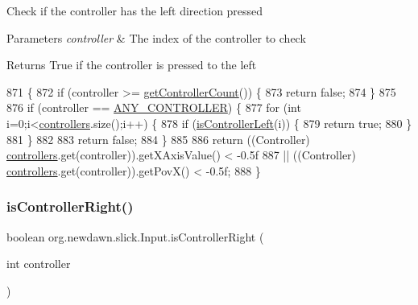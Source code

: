 Check if the controller has the left direction pressed


\begin{DoxyParams}{Parameters}
{\em controller} & The index of the controller to check \\
\hline
\end{DoxyParams}
\begin{DoxyReturn}{Returns}
True if the controller is pressed to the left 
\end{DoxyReturn}

\begin{DoxyCode}
871                                                     \{
872         \textcolor{keywordflow}{if} (controller >= \mbox{\hyperlink{classorg_1_1newdawn_1_1slick_1_1_input_a4a81c87f7d16d49471106d7fbaa0989d}{getControllerCount}}()) \{
873             \textcolor{keywordflow}{return} \textcolor{keyword}{false};
874         \}
875         
876         \textcolor{keywordflow}{if} (controller == \mbox{\hyperlink{classorg_1_1newdawn_1_1slick_1_1_input_a1f3df3cf41eaf8ae3bdf194d5cf96dd0}{ANY\_CONTROLLER}}) \{
877             \textcolor{keywordflow}{for} (\textcolor{keywordtype}{int} i=0;i<\mbox{\hyperlink{classorg_1_1newdawn_1_1slick_1_1_input_a1bcc91bf0db9efc578bd934a8ed9ce67}{controllers}}.size();i++) \{
878                 \textcolor{keywordflow}{if} (\mbox{\hyperlink{classorg_1_1newdawn_1_1slick_1_1_input_a872615473ab4b93e0baceccb68d62787}{isControllerLeft}}(i)) \{
879                     \textcolor{keywordflow}{return} \textcolor{keyword}{true};
880                 \}
881             \}
882             
883             \textcolor{keywordflow}{return} \textcolor{keyword}{false};
884         \}
885         
886         \textcolor{keywordflow}{return} ((Controller) \mbox{\hyperlink{classorg_1_1newdawn_1_1slick_1_1_input_a1bcc91bf0db9efc578bd934a8ed9ce67}{controllers}}.get(controller)).getXAxisValue() < -0.5f
887                 || ((Controller) \mbox{\hyperlink{classorg_1_1newdawn_1_1slick_1_1_input_a1bcc91bf0db9efc578bd934a8ed9ce67}{controllers}}.get(controller)).getPovX() < -0.5f;
888     \}
\end{DoxyCode}
\mbox{\label{classorg_1_1newdawn_1_1slick_1_1_input_a216e74d174302d5f2656027f0983d53a}} 
\subsubsection{\texorpdfstring{is\+Controller\+Right()}{isControllerRight()}}
{\footnotesize\ttfamily boolean org.\+newdawn.\+slick.\+Input.\+is\+Controller\+Right (\begin{DoxyParamCaption}\item[{int}]{controller }\end{DoxyParamCaption})\hspace{0.3cm}{\ttfamily [inline]}}

